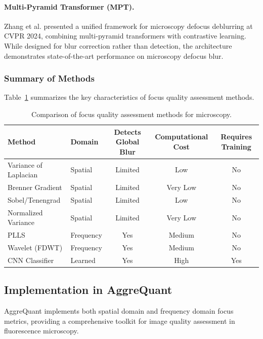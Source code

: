 \paragraph{Multi-Pyramid Transformer (MPT).}
Zhang et al. \cite{zhang2024mpt} presented a unified framework for microscopy defocus deblurring at CVPR 2024, combining multi-pyramid transformers with contrastive learning. While designed for blur correction rather than detection, the architecture demonstrates state-of-the-art performance on microscopy defocus blur.

\subsubsection{Summary of Methods}

Table~\ref{tab:focus_methods_comparison} summarizes the key characteristics of focus quality assessment methods.

\begin{table}[htbp]
\centering
\caption{Comparison of focus quality assessment methods for microscopy.}
\label{tab:focus_methods_comparison}
\begin{tabular}{@{}llccc@{}}
\toprule
\textbf{Method} & \textbf{Domain} & \textbf{Detects Global Blur} & \textbf{Computational Cost} & \textbf{Requires Training} \\
\midrule
Variance of Laplacian & Spatial & Limited & Low & No \\
Brenner Gradient & Spatial & Limited & Very Low & No \\
Sobel/Tenengrad & Spatial & Limited & Low & No \\
Normalized Variance & Spatial & Limited & Very Low & No \\
PLLS & Frequency & Yes & Medium & No \\
Wavelet (FDWT) & Frequency & Yes & Medium & No \\
CNN Classifier & Learned & Yes & High & Yes \\
\bottomrule
\end{tabular}
\end{table}

\subsection{Implementation in AggreQuant}
\label{subsec:focus_implementation}

AggreQuant implements both spatial domain and frequency domain focus metrics, providing a comprehensive toolkit for image quality assessment in fluorescence microscopy.

